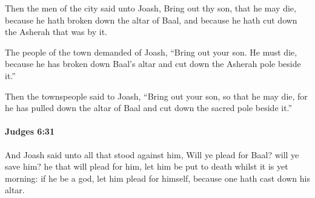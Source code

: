 			\begin{versebox}
					\item[BHS] 
					\item[ASV] Then the men of the city said unto Joash, Bring out thy son, that he may die, because he hath broken down the altar of Baal, and because he hath cut down the Asherah that was by it.
					\item[NIV] The people of the town demanded of Joash, “Bring out your son. He must die, because he has broken down Baal’s altar and cut down the Asherah pole beside it.”
					\item[NRSV] Then the townspeople said to Joash, “Bring out your son, so that he may die, for he has pulled down the altar of Baal and cut down the sacred pole beside it.”
			\end{versebox}

		\paragraph{Judges 6:31} %
			\label{JUDGES-6-31}

			And Joash said unto all that stood against him, Will ye plead for Baal? will ye save him? he that will plead for him, let him be put to death whilst it is yet morning: if he be a god, let him plead for himself, because one hath cast down his altar.

